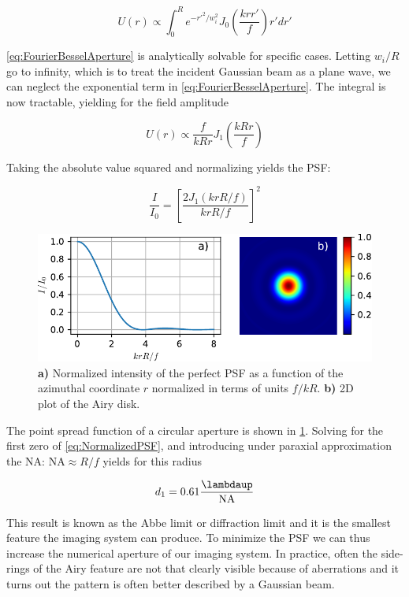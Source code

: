 \begin{equation}\label{eq:FourierBesselAperture}
    U(r) \propto \int_0^R e^{-r'^2/w_i^2} J_0\left(\frac{k r r'}{f}\right)r'dr'
\end{equation}

\cref{eq:FourierBesselAperture} is analytically solvable for specific cases.
Letting $w_i/R$ go to infinity, which is to treat the incident Gaussian beam as a plane wave, we can neglect the exponential term in \cref{eq:FourierBesselAperture}. 
The integral is now tractable, yielding for the field amplitude

\begin{equation}\label{eq:AiryField}
    U(r) \propto \frac{f}{kRr} J_1\left(\frac{k R r}{f}\right)
\end{equation}

Taking the absolute value squared and normalizing yields the \ac{PSF}:

\begin{equation}\label{eq:NormalizedPSF}
    \frac{I}{I_0} = \left[
    \frac{2J_1(k r R/f)}{k r R/f}
    \right]^2
\end{equation}

\begin{figure}
    \centering
    \includegraphics[width = 0.8\linewidth]{figures/AiryDisk.pdf}
    \caption{\textbf{a)} Normalized intensity of the perfect \ac{PSF} as a function of the azimuthal coordinate $r$ normalized in terms of units $f / kR$.
    \textbf{b) }2D plot of the Airy disk.  }
    \label{fig:AiryPlots}
\end{figure}

The point spread function of a circular aperture is shown in \cref{fig:AiryPlots}. 
Solving for the first zero of \cref{eq:NormalizedPSF}, and introducing under paraxial approximation the \ac{NA}: $\text{NA} \approx R/f$ yields for this radius 

\begin{equation}\label{eq:Abbe}
    d_1 = 0.61 \frac{\lambdaup}{\text{NA}}
\end{equation}

This result is known as the Abbe limit or diffraction limit \cite{Hecht2002} and it is the smallest feature the imaging system can produce. 
To minimize the \ac{PSF} we can thus increase the numerical aperture of our imaging system. 
In practice, often the side-rings of the Airy feature are not that clearly visible because of aberrations and it turns out the pattern is often better described by a Gaussian beam. 


